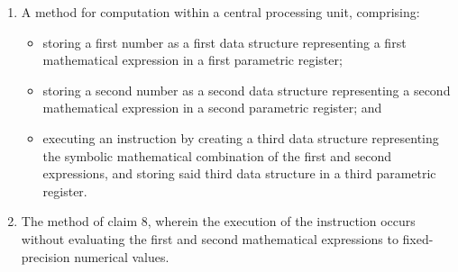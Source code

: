 \documentclass[11pt,letterpaper]{article}
\begin{document}
\begin{enumerate}[label=\textbf{\arabic*.}, leftmargin=0.5in, itemsep=0.4cm]
    \item A method for computation within a central processing unit, comprising:
    \begin{itemize}[leftmargin=0.3in, noitemsep]
        \item storing a first number as a first data structure representing a first mathematical expression in a first parametric register;
        \item storing a second number as a second data structure representing a second mathematical expression in a second parametric register; and
        \item executing an instruction by creating a third data structure representing the symbolic mathematical combination of the first and second expressions, and storing said third data structure in a third parametric register.
    \end{itemize}

    \item The method of claim 8, wherein the execution of the instruction occurs without evaluating the first and second mathematical expressions to fixed-precision numerical values.
\end{enumerate}
\end{document}

